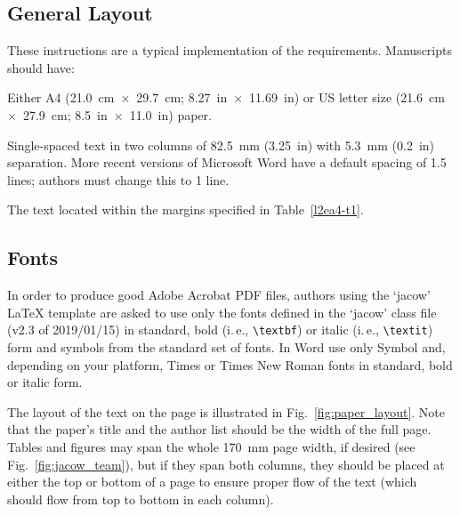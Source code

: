 \subsection{General Layout}

These instructions are a typical implementation of the
requirements. Manuscripts should have:
\begin{Itemize}
    \item  Either A4 (\SI{21.0}{cm}~$\times$~\SI{29.7}{cm}; \SI{8.27}{in}~$\times$~\SI{11.69}{in}) or US
           letter size (\SI{21.6}{cm}~$\times$~\SI{27.9}{cm}; \SI{8.5}{in}~$\times$~\SI{11.0}{in}) paper.
    \item  Single-spaced text in two columns of \SI{82.5}{mm} (\SI{3.25}{in}) with \SI{5.3}{mm}
           (\SI{0.2}{in}) separation. More recent versions of Microsoft Word have a default spacing of 1.5 lines;
           authors must change this to 1 line.
    \item  The text located within the margins specified in Table~\ref{l2ea4-t1}.
\end{Itemize}



\subsection{Fonts}

In order to produce good Adobe Acrobat PDF files, authors
using the `jacow' \LaTeX{} template are asked to use only the fonts
defined in the ‘jacow’ class file (v2.3 of 2019/01/15) in standard, 
bold (i.\,e., \verb|\textbf|) or italic (i.\,e., \verb|\textit|) form and
symbols from the standard set of fonts. In Word use only
Symbol and, depending on your platform, Times or Times New Roman
fonts in standard, bold or italic form.

The layout of the text on the page is illustrated in
Fig.~\ref{fig:paper_layout}. Note that the paper’s title and the author list should
be the width of the full page. Tables and figures may span
the whole \SI{170}{mm} page width, if desired (see Fig.~\ref{fig:jacow_team}), but
if they span both columns, they should be placed at either
the top or bottom of a page to ensure proper flow of the
text (which should flow from top to bottom in each column).

